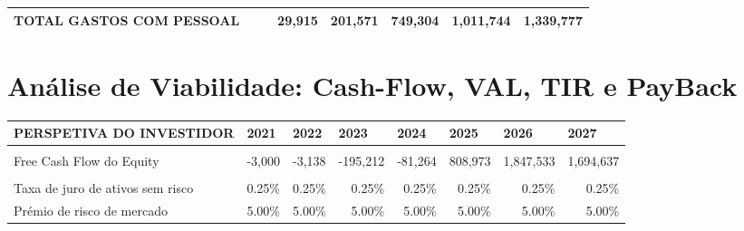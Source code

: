\documentclass[11pt]{article}
\begin{document}
\begin{adjustbox}{center}
\begin{tabular}{lllrrrrr}
			\multicolumn{1}{|l|}{TOTAL GASTOS COM PESSOAL}                                & \multicolumn{1}{l|}{}        & \multicolumn{1}{l|}{}     & \multicolumn{1}{r|}{29,915} & \multicolumn{1}{r|}{201,571} & \multicolumn{1}{r|}{749,304} & \multicolumn{1}{r|}{1,011,744} & \multicolumn{1}{r|}{1,339,777} \\ \hline
		\end{tabular}
	\end{adjustbox}
	
	\pagebreak
	
	\large
	\section{Análise de Viabilidade: Cash-Flow, VAL, TIR e PayBack}
	
	\small
	\begin{adjustbox}{center}
		\begin{tabular}{lrrrrrrr}
			\hline
			\multicolumn{1}{|c|}{PERSPETIVA DO INVESTIDOR}               & \multicolumn{1}{l|}{2021}      & \multicolumn{1}{l|}{2022}      & \multicolumn{1}{l|}{2023}     & \multicolumn{1}{l|}{2024}      & \multicolumn{1}{l|}{2025}    & \multicolumn{1}{l|}{2026}      & \multicolumn{1}{l|}{2027}      \\ \hline
			& \multicolumn{1}{l}{}           & \multicolumn{1}{l}{}           & \multicolumn{1}{l}{}          & \multicolumn{1}{l}{}           & \multicolumn{1}{l}{}         & \multicolumn{1}{l}{}           & \multicolumn{1}{l}{}           \\ \hline
			\multicolumn{1}{|l|}{Free Cash Flow do Equity}                & \multicolumn{1}{r|}{-3,000}    & \multicolumn{1}{r|}{-3,138}     & \multicolumn{1}{r|}{-195,212} & \multicolumn{1}{r|}{-81,264}   & \multicolumn{1}{r|}{808,973} & \multicolumn{1}{r|}{1,847,533} & \multicolumn{1}{r|}{1,694,637} \\ \hline
			&                                &                                &                               &                                &                              &                                &                                \\ \hline
			\multicolumn{1}{|l|}{Taxa de juro de ativos sem risco}        & \multicolumn{1}{r|}{0.25\%}    & \multicolumn{1}{r|}{0.25\%}    & \multicolumn{1}{r|}{0.25\%}   & \multicolumn{1}{r|}{0.25\%}    & \multicolumn{1}{r|}{0.25\%}  & \multicolumn{1}{r|}{0.25\%}    & \multicolumn{1}{r|}{0.25\%}    \\ \hline
			\multicolumn{1}{|l|}{Prémio de risco de mercado}              & \multicolumn{1}{r|}{5.00\%}    & \multicolumn{1}{r|}{5.00\%}    & \multicolumn{1}{r|}{5.00\%}   & \multicolumn{1}{r|}{5.00\%}    & \multicolumn{1}{r|}{5.00\%}  & \multicolumn{1}{r|}{5.00\%}    & \multicolumn{1}{r|}{5.00\%}    \\ \hline

\end{tabular}
\end{adjustbox}
\end{document}
